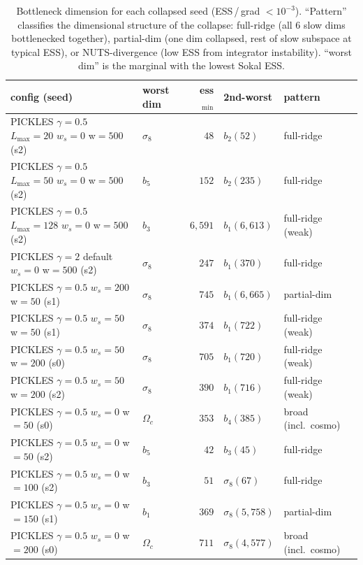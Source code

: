 \documentclass{article}
\begin{document}
\begin{table}[h]
\centering
\caption{Bottleneck dimension for each collapsed seed
(ESS\,/\,grad $< 10^{-3}$).  ``Pattern'' classifies the dimensional
structure of the collapse: full-ridge (all $6$ slow dims bottlenecked
together), partial-dim (one dim collapsed, rest of slow subspace at
typical ESS), or NUTS-divergence (low ESS from integrator instability).
``worst dim'' is the marginal with the lowest Sokal ESS.}
\label{tab:desCollapseDim}
\small
\begin{tabular}{l l r l l}
\toprule
config (seed) & worst dim & ess$_{\min}$ & 2nd-worst & pattern \\
\midrule
PICKLES $\gamma{=}0.5$ $L_{\max}{=}20$ $w_s{=}0$ w$=500$ (s2) & $\sigma_8$ & $48$ & $b_2(52)$ & full-ridge\\
PICKLES $\gamma{=}0.5$ $L_{\max}{=}50$ $w_s{=}0$ w$=500$ (s2) & $b_5$    & $152$ & $b_2(235)$ & full-ridge\\
PICKLES $\gamma{=}0.5$ $L_{\max}{=}128$ $w_s{=}0$ w$=500$ (s2)& $b_3$    & $6{,}591$ & $b_1(6{,}613)$ & full-ridge (weak)\\
PICKLES $\gamma{=}2$ default $w_s{=}0$ w$=500$ (s2)           & $\sigma_8$ & $247$ & $b_1(370)$ & full-ridge\\
\midrule
PICKLES $\gamma{=}0.5$ $w_s{=}200$ w$=50$ (s1)                & $\sigma_8$ & $745$ & $b_1(6{,}665)$ & partial-dim\\
PICKLES $\gamma{=}0.5$ $w_s{=}50$ w$=50$ (s1)                 & $\sigma_8$ & $374$ & $b_1(722)$ & full-ridge (weak)\\
PICKLES $\gamma{=}0.5$ $w_s{=}50$ w$=200$ (s0)                & $\sigma_8$ & $705$ & $b_1(720)$ & full-ridge (weak)\\
PICKLES $\gamma{=}0.5$ $w_s{=}50$ w$=200$ (s2)                & $\sigma_8$ & $390$ & $b_1(716)$ & full-ridge (weak)\\
PICKLES $\gamma{=}0.5$ $w_s{=}0$ w$=50$ (s0)                  & $\Omega_c$ & $353$ & $b_4(385)$ & broad (incl.\ cosmo)\\
PICKLES $\gamma{=}0.5$ $w_s{=}0$ w$=50$ (s2)                  & $b_5$    & $42$  & $b_3(45)$ & full-ridge\\
PICKLES $\gamma{=}0.5$ $w_s{=}0$ w$=100$ (s2)                 & $b_3$    & $51$  & $\sigma_8(67)$ & full-ridge\\
PICKLES $\gamma{=}0.5$ $w_s{=}0$ w$=150$ (s1)                 & $b_1$    & $369$ & $\sigma_8(5{,}758)$ & partial-dim\\
PICKLES $\gamma{=}0.5$ $w_s{=}0$ w$=200$ (s0)                 & $\Omega_c$ & $711$ & $\sigma_8(4{,}577)$ & broad (incl.\ cosmo)\\

\end{tabular}
\end{table}
\end{document}
